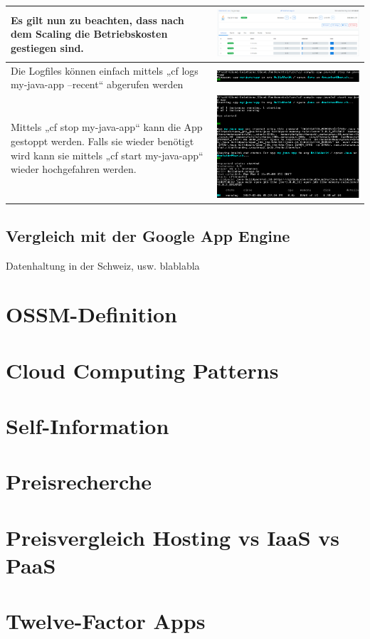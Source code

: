\begin{longtable}{| p{5cm} | p{11cm} |}
Es gilt nun zu beachten, dass nach dem Scaling die Betriebskosten gestiegen sind. &\includegraphics[width=0.65\columnwidth, valign=T]{images/image18.png} \\ \hline
Die Logfiles können einfach mittels „cf logs my-java-app --recent“ abgerufen werden &\includegraphics[width=0.65\columnwidth, valign=T]{images/image19.png} \\ \hline
Mittels „cf stop my-java-app“ kann die App gestoppt werden. Falls sie wieder benötigt wird kann sie mittels „cf start my-java-app“ wieder hochgefahren werden. 
&\includegraphics[width=0.65\columnwidth, valign=T]{images/image20.png} \\ \hline
\end{longtable}

\section{Vergleich mit der Google App Engine}
Datenhaltung in der Schweiz, usw. blablabla

\chapter{OSSM-Definition}
\chapter{Cloud Computing Patterns}
\chapter{Self-Information}
\chapter{Preisrecherche}
\chapter{Preisvergleich Hosting vs IaaS vs PaaS}
\chapter{Twelve-Factor Apps}


